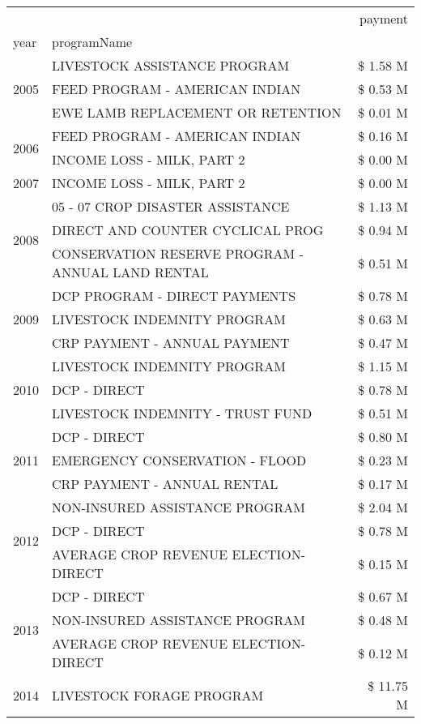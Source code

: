 \begin{tabular}{llr}
\toprule
 &  & payment \\
year & programName &  \\
\midrule
\multirow[t]{3}{*}{2005} & LIVESTOCK ASSISTANCE PROGRAM & \$ 1.58 M \\
 & FEED PROGRAM - AMERICAN INDIAN & \$ 0.53 M \\
 & EWE LAMB REPLACEMENT OR RETENTION & \$ 0.01 M \\
\cline{1-3}
\multirow[t]{2}{*}{2006} & FEED PROGRAM - AMERICAN INDIAN & \$ 0.16 M \\
 & INCOME LOSS - MILK, PART 2 & \$ 0.00 M \\
\cline{1-3}
2007 & INCOME LOSS - MILK, PART 2 & \$ 0.00 M \\
\cline{1-3}
\multirow[t]{3}{*}{2008} & 05 - 07 CROP DISASTER ASSISTANCE & \$ 1.13 M \\
 & DIRECT AND COUNTER CYCLICAL PROG & \$ 0.94 M \\
 & CONSERVATION RESERVE PROGRAM - ANNUAL LAND RENTAL & \$ 0.51 M \\
\cline{1-3}
\multirow[t]{3}{*}{2009} & DCP PROGRAM - DIRECT PAYMENTS & \$ 0.78 M \\
 & LIVESTOCK INDEMNITY PROGRAM & \$ 0.63 M \\
 & CRP PAYMENT - ANNUAL PAYMENT & \$ 0.47 M \\
\cline{1-3}
\multirow[t]{3}{*}{2010} & LIVESTOCK INDEMNITY PROGRAM & \$ 1.15 M \\
 & DCP - DIRECT & \$ 0.78 M \\
 & LIVESTOCK INDEMNITY - TRUST FUND & \$ 0.51 M \\
\cline{1-3}
\multirow[t]{3}{*}{2011} & DCP - DIRECT & \$ 0.80 M \\
 & EMERGENCY CONSERVATION - FLOOD & \$ 0.23 M \\
 & CRP PAYMENT - ANNUAL RENTAL & \$ 0.17 M \\
\cline{1-3}
\multirow[t]{3}{*}{2012} & NON-INSURED ASSISTANCE PROGRAM & \$ 2.04 M \\
 & DCP - DIRECT & \$ 0.78 M \\
 & AVERAGE CROP REVENUE ELECTION-DIRECT & \$ 0.15 M \\
\cline{1-3}
\multirow[t]{3}{*}{2013} & DCP - DIRECT & \$ 0.67 M \\
 & NON-INSURED ASSISTANCE PROGRAM & \$ 0.48 M \\
 & AVERAGE CROP REVENUE ELECTION-DIRECT & \$ 0.12 M \\
\cline{1-3}
\multirow[t]{3}{*}{2014} & LIVESTOCK FORAGE PROGRAM & \$ 11.75 M \\

\end{tabular}
